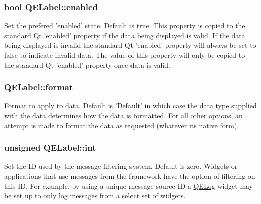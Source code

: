 \hypertarget{classQELabel_aeb323a7764411d7e2d3621eacb975211}{
\subsubsection[{enabled}]{\setlength{\rightskip}{0pt plus 5cm}bool QELabel::enabled}}
\label{classQELabel_aeb323a7764411d7e2d3621eacb975211}
Set the prefered 'enabled' state. Default is true. This property is copied to the standard Qt 'enabled' property if the data being displayed is valid. If the data being displayed is invalid the standard Qt 'enabled' property will always be set to false to indicate invalid data. The value of this property will only be copied to the standard Qt 'enabled' property once data is valid. \hypertarget{classQELabel_a7ffba4d987689b6b3bf9d3d4a5bed749}{
\subsubsection[{format}]{ QELabel::format}}
\label{classQELabel_a7ffba4d987689b6b3bf9d3d4a5bed749}
Format to apply to data. Default is 'Default' in which case the data type supplied with the data determines how the data is formatted. For all other options, an attempt is made to format the data as requested (whatever its native form). \hypertarget{classQELabel_ad1718c5b99720e4aae40bacad02954c1}{
\subsubsection[{int}]{\setlength{\rightskip}{0pt plus 5cm}unsigned QELabel::int}}
\label{classQELabel_ad1718c5b99720e4aae40bacad02954c1}
Set the ID used by the message filtering system. Default is zero. Widgets or applications that use messages from the framework have the option of filtering on this ID. For example, by using a unique message source ID a \hyperlink{classQELog}{QELog} widget may be set up to only log messages from a select set of widgets.

